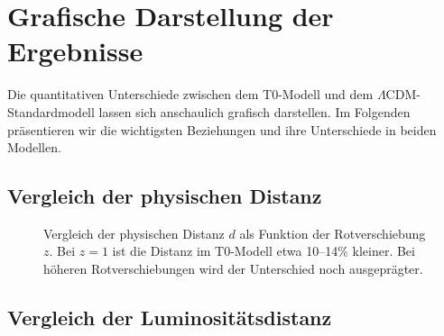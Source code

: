 \documentclass[a4paper,12pt]{article}
\theoremstyle{definition}
\theoremstyle{remark}
\begin{document}
	\section{Grafische Darstellung der Ergebnisse}
	
	Die quantitativen Unterschiede zwischen dem T0-Modell und dem \(\Lambda\)CDM-Standardmodell lassen sich anschaulich grafisch darstellen. Im Folgenden präsentieren wir die wichtigsten Beziehungen und ihre Unterschiede in beiden Modellen.
	
	\subsection{Vergleich der physischen Distanz}
	
	\begin{figure}[H]
		\centering
		\caption{Vergleich der physischen Distanz $d$ als Funktion der Rotverschiebung $z$. Bei $z=1$ ist die Distanz im T0-Modell etwa 10–14\% kleiner. Bei höheren Rotverschiebungen wird der Unterschied noch ausgeprägter.}
		\label{fig:phys_distanz}
	\end{figure}
	
	\subsection{Vergleich der Luminositätsdistanz}
	
\end{document}

